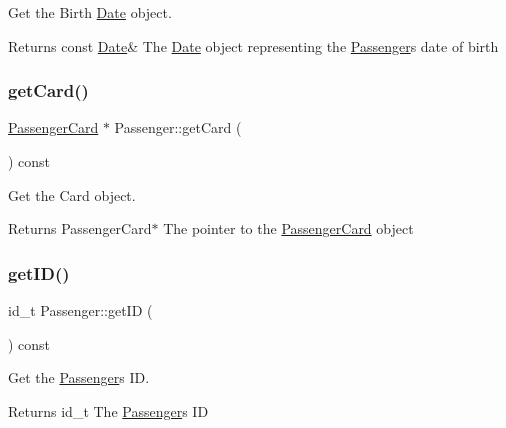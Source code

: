 Get the Birth \mbox{\hyperlink{classDate}{Date}} object. 

\begin{DoxyReturn}{Returns}
const \mbox{\hyperlink{classDate}{Date}}\& The \mbox{\hyperlink{classDate}{Date}} object representing the \mbox{\hyperlink{classPassenger}{Passenger}}\textquotesingle{}s date of birth 
\end{DoxyReturn}
\mbox{\label{classPassenger_ae8d5310db80438702dec5f4d649289f1}} 
\subsubsection{\texorpdfstring{get\+Card()}{getCard()}}
{\footnotesize\ttfamily \mbox{\hyperlink{classPassengerCard}{Passenger\+Card}} $\ast$ Passenger\+::get\+Card (\begin{DoxyParamCaption}{ }\end{DoxyParamCaption}) const}



Get the Card object. 

\begin{DoxyReturn}{Returns}
Passenger\+Card$\ast$ The pointer to the \mbox{\hyperlink{classPassengerCard}{Passenger\+Card}} object 
\end{DoxyReturn}
\mbox{\label{classPassenger_ae6fcc19037be144f654c623c5b78ae24}} 
\subsubsection{\texorpdfstring{get\+I\+D()}{getID()}}
{\footnotesize\ttfamily id\+\_\+t Passenger\+::get\+ID (\begin{DoxyParamCaption}{ }\end{DoxyParamCaption}) const}



Get the \mbox{\hyperlink{classPassenger}{Passenger}}\textquotesingle{}s ID. 

\begin{DoxyReturn}{Returns}
id\+\_\+t The \mbox{\hyperlink{classPassenger}{Passenger}}\textquotesingle{}s ID 
\end{DoxyReturn}
\mbox{\label{classPassenger_a7c919f6947817ff1c6a4ee51923c116f}} 
